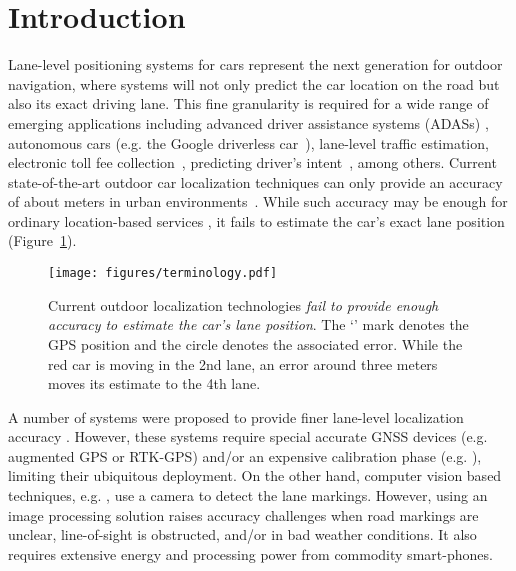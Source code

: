 \documentclass[10pt, conference, compsocconf]{IEEEtran}
\begin{document}
\section{Introduction}\label{sec:intro} Lane-level positioning systems for cars represent the next generation for outdoor navigation, where systems will not only predict the car location on the road but also its exact driving lane. This fine granularity is required for a wide range of emerging applications including advanced driver assistance systems (ADASs) \cite{hofmann2009quality}, autonomous cars (e.g. the Google driverless car~\cite{markoff2010google}), lane-level traffic estimation, electronic toll fee collection~\cite{de2011traffic}, predicting driver's intent~\cite{doshi2011tactical}, among others.  Current state-of-the-art outdoor car localization techniques can only provide an accuracy of about  meters in urban environments~\cite{aly2013dejavu}. While such accuracy may be enough for ordinary location-based services \cite{ye2010location,aly_map14}, it fails to estimate the car's exact lane position (Figure~\ref{fig:loc_error}).

\begin{figure}[!t]
\centering
\texttt{[image: figures/terminology.pdf]}
\caption{Current outdoor localization technologies \emph{fail to provide enough accuracy to estimate the car's lane position}. The `' mark denotes the GPS position and the circle denotes the associated error. While the red car is moving in the 2nd lane, an error around three meters moves its estimate to the 4th lane.}
\label{fig:loc_error}
\end{figure}
A number of systems were proposed to provide finer lane-level localization accuracy \cite{toledo2010lane,tao2013lane,ren2010lane}. However, these systems require special accurate GNSS devices (e.g. augmented GPS or RTK-GPS) and/or an expensive calibration phase (e.g. \cite{toledo2010lane,tao2013lane}), limiting their ubiquitous deployment. On the other hand, computer vision based techniques, e.g. \cite{ren2010lane}, use a camera to detect the lane markings. However, using an image processing solution raises accuracy challenges when road markings are unclear, line-of-sight is obstructed, and/or in bad weather conditions. It also requires extensive energy and processing power from commodity smart-phones.
\end{document}
